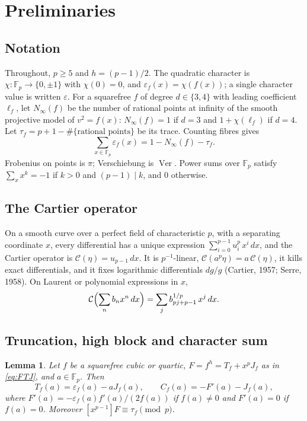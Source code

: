 \documentclass[11pt,a4paper]{article}
\numberwithin{equation}{section}
\theoremstyle{plain}
\newtheorem{lemma}[theorem]{Lemma}
\theoremstyle{definition}
\DeclareMathOperator{\Ver}{Ver}
\newcommand{\F}{\mathbb{F}}
\newcommand{\C}{\mathcal{C}}
\newcommand{\eps}{\varepsilon}
\begin{document}
\section{Preliminaries}\label{sec:prelim}

\subsection{Notation}
Throughout, $p\ge5$ and $h=(p-1)/2$. The quadratic character is $\chi:\F_p\to\{0,\pm1\}$ with $\chi(0)=0$, and $\eps_f(x)=\chi(f(x))$; a single character value is written $\eps$. For a squarefree $f$ of degree $d\in\{3,4\}$ with leading coefficient $\ell_f$, let $N_\infty(f)$ be the number of rational points at infinity of the smooth projective model of $v^2=f(x)$: $N_\infty(f)=1$ if $d=3$ and $1+\chi(\ell_f)$ if $d=4$. Let $\tau_f=p+1-\#\{\text{rational points}\}$ be its trace. Counting fibres gives
\begin{equation}\label{eq:fibre}
\sum_{x\in\F_p}\eps_f(x)=1-N_\infty(f)-\tau_f .
\end{equation}
Frobenius on points is $\pi$; Verschiebung is $\Ver$. Power sums over $\F_p$ satisfy $\sum_{x}x^k=-1$ if $k>0$ and $(p-1)\mid k$, and $0$ otherwise.

\subsection{The Cartier operator}
On a smooth curve over a perfect field of characteristic $p$, with a separating coordinate $x$, every differential has a unique expression $\sum_{i=0}^{p-1}u_i^p\,x^i\,dx$, and the Cartier operator is $\C(\eta)=u_{p-1}\,dx$. It is $p^{-1}$-linear, $\C(a^p\eta)=a\,\C(\eta)$, it kills exact differentials, and it fixes logarithmic differentials $dg/g$ (Cartier, 1957; Serre, 1958). On Laurent or polynomial expressions in $x$,
\begin{equation}\label{eq:cartier}
\C\Bigl(\sum_n b_nx^n\,dx\Bigr)=\sum_j b_{pj+p-1}^{1/p}\,x^j\,dx .
\end{equation}

\subsection{Truncation, high block and character sum}
\begin{lemma}\label{lem:three}
Let $f$ be a squarefree cubic or quartic, $F=f^h=T_f+x^pJ_f$ as in \eqref{eq:FTJ}, and $a\in\F_p$. Then
\begin{equation}\label{eq:three}
T_f(a)=\eps_f(a)-aJ_f(a),\qquad C_f(a)=-F'(a)-J_f(a),
\end{equation}
where $F'(a)=-\eps_f(a)f'(a)/(2f(a))$ if $f(a)\neq0$ and $F'(a)=0$ if $f(a)=0$. Moreover $[x^{p-1}]F\equiv\tau_f\pmod p$.
\end{lemma}
\end{document}
